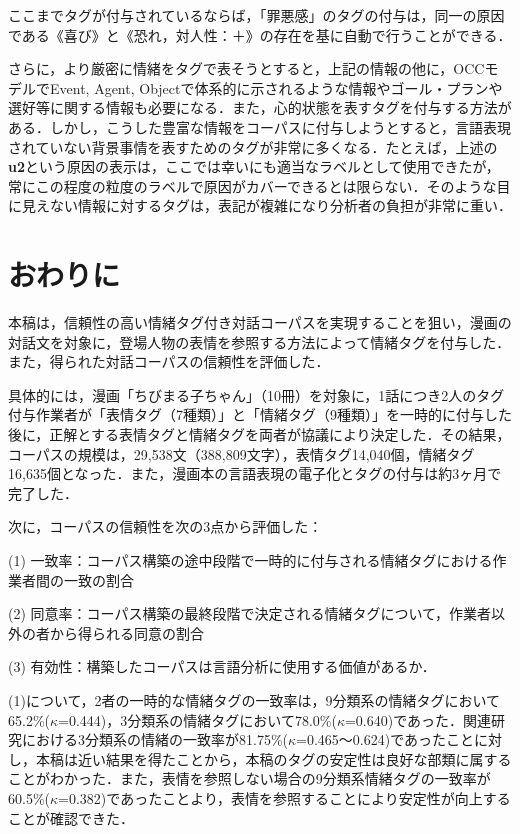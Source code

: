 \documentclass[japanese]{jnlp_1.3c}
\begin{document}
ここまでタグが付与されているならば，「罪悪感」のタグの付与は，同一の原因である《喜び》と《恐れ，対人性：＋》の存在を基に自動で行うことができる．

さらに，より厳密に情緒をタグで表そうとすると，上記の情報の他に，OCCモデルでEvent, Agent, Objectで体系的に示されるような情報やゴール・プランや選好等に関する情報も必要になる\cite{Ortony88}．また，心的状態を表すタグを付与する方法がある\cite{徳久&中野&山下&岡田01}．しかし，こうした豊富な情報をコーパスに付与しようとすると，言語表現されていない背景事情を表すためのタグが非常に多くなる．たとえば，上述の{\bf u2}という原因の表示は，ここでは幸いにも適当なラベルとして使用できたが，常にこの程度の粒度のラベルで原因がカバーできるとは限らない．そのような目に見えない情報に対するタグは，表記が複雑になり分析者の負担が非常に重い\cite{古塩&徳久04}．

\section{おわりに}

本稿は，信頼性の高い情緒タグ付き対話コーパスを実現することを狙い，漫画の対話文を対象に，登場人物の表情を参照する方法によって情緒タグを付与した．また，得られた対話コーパスの信頼性を評価した．

具体的には，漫画「ちびまる子ちゃん」（10冊）を対象に，1話につき2人のタグ付与作業者が「表情タグ（7種類）」と「情緒タグ（9種類）」を一時的に付与した後に，正解とする表情タグと情緒タグを両者が協議により決定した．その結果，コーパスの規模は，29,538文（388,809文字），表情タグ14,040個，情緒タグ16,635個となった．また，漫画本の言語表現の電子化とタグの付与は約3ヶ月で完了した．

次に，コーパスの信頼性を次の3点から評価した：
\begin{description}
\item (1) 一致率：コーパス構築の途中段階で一時的に付与される情緒タグにおける作業者間の一致の割合

\item (2) 同意率：コーパス構築の最終段階で決定される情緒タグについて，作業者以外の者から得られる同意の割合

\item (3) 有効性：構築したコーパスは言語分析に使用する価値があるか．

\end{description}

(1)について，2者の一時的な情緒タグの一致率は，9分類系の情緒タグにおいて65.2\%($\kappa$=0.444)，3分類系の情緒タグにおいて78.0\%($\kappa$=0.640)であった．関連研究\cite{Litman03}における3分類系の情緒の一致率が81.75\%($\kappa$=0.465〜0.624)であったことに対し，本稿は近い結果を得たことから，本稿のタグの安定性は良好な部類に属することがわかった．また，表情を参照しない場合の9分類系情緒タグの一致率が60.5\%($\kappa$=0.382)であったことより，表情を参照することにより安定性が向上することが確認できた．
\end{document}
